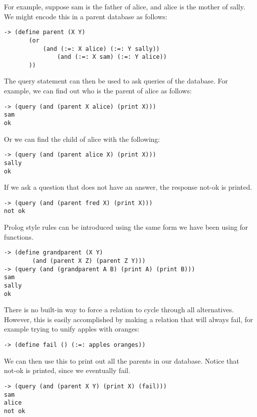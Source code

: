 For example, suppose {\sf sam} is the father of {\sf alice}, and {\sf alice} is
the mother of {\sf sally}.  We might encode this in a parent database as
follows:

\begin{lstlisting}
-> (define parent (X Y)
       (or
           (and (:=: X alice) (:=: Y sally))
               (and (:=: X sam) (:=: Y alice))
       ))
\end{lstlisting}

The query statement can then be used to ask queries of the database.  For
example, we can find out who is the parent of {\sf alice} as follows:

\begin{lstlisting}
-> (query (and (parent X alice) (print X)))
sam
ok
\end{lstlisting}

Or we can find the child of {\sf alice} with the following:

\begin{lstlisting}
-> (query (and (parent alice X) (print X)))
sally
ok
\end{lstlisting}

If we ask a question that does not have an answer, the response not-ok is
printed.

\begin{lstlisting}
-> (query (and (parent fred X) (print X)))
not ok
\end{lstlisting}

Prolog style rules can be introduced using the same form we have been using
for functions.

\begin{lstlisting}
-> (define grandparent (X Y)
        (and (parent X Z) (parent Z Y)))
-> (query (and (grandparent A B) (print A) (print B)))
sam
sally
ok
\end{lstlisting}

There is no built-in way to force a relation to cycle through all
alternatives.  However, this is easily accomplished by making a relation
that will always fail, for example trying to unify apples with oranges:

\begin{lstlisting}
-> (define fail () (:=: apples oranges))
\end{lstlisting}

We can then use this to print out all the parents in our database.
Notice that not-ok is printed, since we eventually fail.

\begin{lstlisting}
-> (query (and (parent X Y) (print X) (fail)))
sam
alice
not ok
\end{lstlisting}

